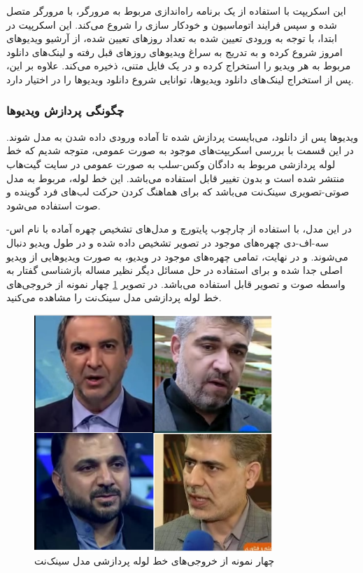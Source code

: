 این اسکریپت با استفاده از یک برنامه راه‌اندازی
مربوط به مرورگر، با مرورگر متصل شده و سپس فرایند اتوماسیون و خودکار سازی را شروع می‌کند. این اسکرپیت در ابتدا، با توجه به ورودی تعیین شده به تعداد روز‌های تعیین شده، از آرشیو ویدیو‌های امروز شروع کرده و به تدریج به سراغ ویدیو‌های روز‌های قبل رفته و لینک‌های دانلود مربوط به هر ویدیو را استخراج کرده و در یک فایل متنی، ذخیره می‌کند. علاوه بر این، پس از استخراج لینک‌های دانلود ویدیو‌ها، توانایی شروع دانلود ویدیو‌ها را در اختیار دارد.

\subsubsection{چگونگی پردازش ویدیو‌ها}

ویدیو‌ها پس از دانلود، می‌بایست پردازش شده تا آماده ورودی داده شدن به مدل شوند. در این قسمت با بررسی اسکریپت‌های موجود به صورت عمومی، متوجه شدیم که خط لوله
پردازشی مربوط به دادگان وکس-سلب به صورت عمومی در سایت گیت‌هاب منتشر شده است و بدون تغییر قابل استفاده می‌باشد. این خط لوله، مربوط به مدل صوتی-تصویری سینک‌نت
می‌باشد که برای هماهنگ کردن حرکت لب‌های فرد گوینده و صوت استفاده می‌شود.

در این مدل، با استفاده از چارچوب پایتورچ و مدل‌های تشخیص چهره آماده با نام اس-سه-اف-دی
چهره‌های موجود در تصویر تشخیص داده شده و در طول ویدیو دنبال می‌شوند. و در نهایت، تمامی چهره‌های موجود در ویدیو، به صورت ویدیو‌هایی از ویدیو اصلی جدا شده و برای استفاده در حل مسائل دیگر نظیر مساله بازشناسی گفتار به واسطه صوت و تصویر قابل استفاده می‌باشد. در تصویر 
\ref{fig:syncnet-sample}
چهار نمونه از خروجی‌های خط لوله پردازشی مدل سینک‌نت را مشاهده می‌کنید.

\begin{figure}[!h]
	\centering
	\captionsetup{justification=centering}
	\includegraphics[width=9cm]{images/syncnet-sample}
	\caption{چهار نمونه از خروجی‌های خط لوله پردازشی مدل سینک‌نت}
	\label{fig:syncnet-sample}
\end{figure}


